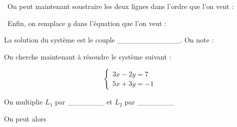 \documentclass[12pt]{article}
\begin{document}
\vspace{20pt}

\textbullet \ On peut maintenant soustraire les deux lignes dans l'ordre que l'on veut :

\vspace{0.5cm}
{\color{black!45}\dotfill}

\vspace{0.5cm}
{\color{black!45}\dotfill}

\vspace{0.5cm}
{\color{black!45}\dotfill}

\vspace{20pt}

\textbullet \ Enfin, on remplace $y$ dans l'équation que l'on veut : 

\vspace{0.5cm}
{\color{black!45}\dotfill}

\vspace{0.5cm}
{\color{black!45}\dotfill}


\vspace{20pt}
La solution du système est le couple \_\_\_\_\_\_\_\_\_\_\_\_. On note : 

\vspace{20pt}
On cherche maintenant à résoudre le système suivant : 

$$
\left\{
    \begin{array}{ll}
        3x - 2y = 7 \\
        5x + 3y = -1
    \end{array}
\right.
$$

\vspace{0.5cm}
{\color{black!45}\dotfill}

\vspace{0.5cm}
{\color{black!45}\dotfill}

\vspace{20pt}

On multiplie $L_1$ par \_\_\_\_\_\_\_ et $L_2$ par \_\_\_\_\_\_\_

\vspace{0.5cm}
{\color{black!45}\dotfill}

\vspace{0.5cm}
{\color{black!45}\dotfill}

\vspace{0.5cm}
{\color{black!45}\dotfill}


\vspace{20pt}
On peut alors {\color{black!45}\dotfill}

\vspace{0.5cm}
{\color{black!45}\dotfill}
\end{document}
